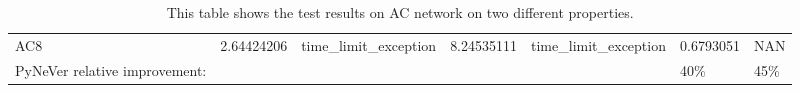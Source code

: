 \begin{table}[]
{\begin{tabular}{@{}lllllll@{}}
    AC8     & {\color[HTML]{ACB9CA} 2.64424206} & {\color[HTML]{ACB9CA} time\_limit\_exception} & {\color[HTML]{ACB9CA} 8.24535111} & {\color[HTML]{ACB9CA} time\_limit\_exception} & {\color[HTML]{ACB9CA} 0.6793051}  & {\color[HTML]{ACB9CA} NAN}        \\ \cmidrule(r){1-7}
    PyNeVer relative improvement:        &                                   &                                               &                                   &                                               & {\color[HTML]{FF0000} 40\%}       & {\color[HTML]{FF0000} 45\%}       \\ \cmidrule(r){1-7}
    \end{tabular}%
    }
    \caption{This table shows the test results on AC network on two different properties.}
    \label{table:AC}
\end{table}


